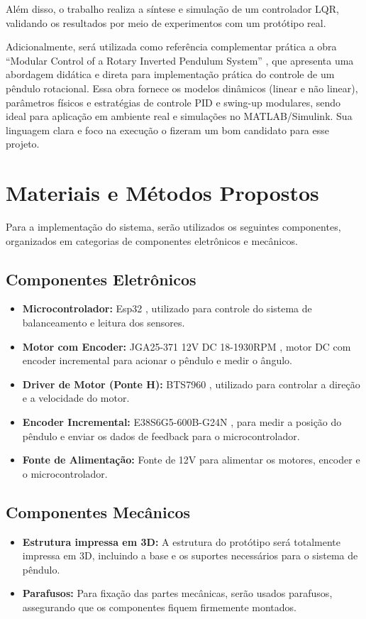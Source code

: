\documentclass[9pt,a4paper,twocolumn,twoside]{tau-class/tau}
\begin{document}
    Além disso, o trabalho realiza a síntese e simulação de um controlador LQR, validando os resultados por meio de experimentos com um protótipo real.
    
    Adicionalmente, será utilizada como referência complementar prática a obra “Modular Control of a Rotary Inverted Pendulum System” \cite{diao2016}, que apresenta uma abordagem didática e direta para implementação prática do controle de um pêndulo rotacional. Essa obra fornece os modelos dinâmicos (linear e não linear), parâmetros físicos e estratégias de controle PID e swing-up modulares, sendo ideal para aplicação em ambiente real e simulações no MATLAB/Simulink. Sua linguagem clara e foco na execução o fizeram um bom candidato para esse projeto.


\section{Materiais e Métodos Propostos}

    Para a implementação do sistema, serão utilizados os seguintes componentes, organizados em categorias de componentes eletrônicos e mecânicos.

    \subsection{Componentes Eletrônicos}
    \begin{itemize}
        \item \textbf{Microcontrolador:} Esp32 \cite{esp32Datasheet}, utilizado para controle do sistema de balanceamento e leitura dos sensores.
        \item \textbf{Motor com Encoder:} JGA25-371 12V DC 18-1930RPM \cite{mot4datasheet}, motor DC com encoder incremental para acionar o pêndulo e medir o ângulo.
        \item \textbf{Driver de Motor (Ponte H):} BTS7960 \cite{bts7960datasheet}, utilizado para controlar a direção e a velocidade do motor.
        \item \textbf{Encoder Incremental:} E38S6G5-600B-G24N \cite{e38s6g5datasheet}, para medir a posição do pêndulo e enviar os dados de feedback para o microcontrolador.
        \item \textbf{Fonte de Alimentação:} Fonte de 12V para alimentar os motores, encoder e o microcontrolador.
    \end{itemize}

    \subsection{Componentes Mecânicos}
    \begin{itemize}
        \item \textbf{Estrutura impressa em 3D:} A estrutura do protótipo será totalmente impressa em 3D, incluindo a base e os suportes necessários para o sistema de pêndulo.
        \item \textbf{Parafusos:} Para fixação das partes mecânicas, serão usados parafusos, assegurando que os componentes fiquem firmemente montados.
    \end{itemize}
    
\end{document}
